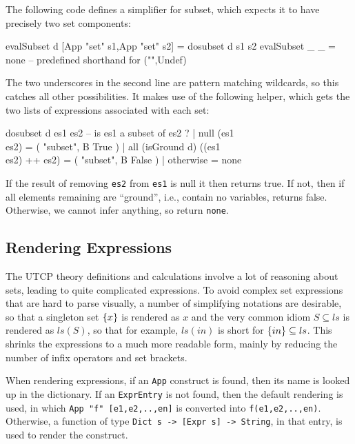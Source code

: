 The following code defines a simplifier for subset,
which expects it to have precisely two set components:
\begin{code}
evalSubset d [App "set" s1,App "set" s2] = dosubset d s1 s2
evalSubset _ _ = none -- predefined shorthand for ("",Undef)
\end{code}
The two underscores in the second line are pattern matching
wildcards, so this catches all other possibilities.
It makes use of the following helper,
which gets the two lists of expressions associated with each set:
\begin{code}
dosubset d es1 es2 -- is es1 a subset of es2 ?
  | null (es1 \\ es2)  =  ( "subset", B True )
  | all (isGround d) ((es1 \\ es2) ++ es2)
                       =  ( "subset", B False )
  | otherwise          =  none
\end{code}
If the result of removing \texttt{es2} from \texttt{es1} is null
it then returns true.
If not, then if all elements remaining are ``ground'',
i.e., contain no variables, returns false.
Otherwise, we cannot infer anything, so return \texttt{none}.

\subsection{Rendering Expressions}

The UTCP theory definitions and calculations
involve a lot of reasoning about sets,
leading to quite complicated expressions.
To avoid complex set expressions that are hard to parse visually,
a number of simplifying notations are desirable,
so that a singleton set $\{{x}\}$ is rendered as $x$
and the very common idiom $S \subseteq ls$
is rendered as $ls(S)$,
so that for example, $ls(in)$ is short for $\{{in}\} \subseteq ls$.
This shrinks the expressions to a much more readable form,
mainly by reducing the number of infix operators and set brackets.


When rendering expressions,
if an \texttt{App} construct is found, then its name
is looked up in the dictionary.
If an \texttt{ExprEntry} is not found, then the default rendering is used,
in which \verb$App "f" [e1,e2,..,en]$
is converted into \verb$f(e1,e2,..,en)$.
Otherwise, a function of type \verb$Dict s -> [Expr s] -> String$,
in that entry, is used to render the construct.

